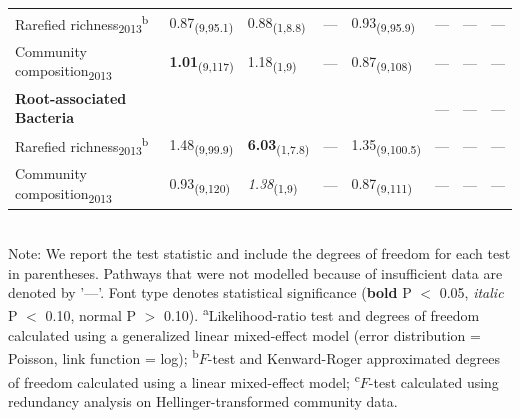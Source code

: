 \documentclass[11pt]{article}
\begin{document}
\begin{table}
\begin{tabular}{@{}llllllll@{}}
Rarefied richness\textsubscript{2013}\textsuperscript{b}     & 0.87\textsubscript{(9,95.1)}  & 0.88\textsubscript{(1,8.8)}  & ---               & 0.93\textsubscript{(9,95.9)}  & ---             & ---              & ---             \\
Community composition\textsubscript{2013}  & \textbf{1.01}\textsubscript{(9,117)}   & 1.18\textsubscript{(1,9)}    & ---               & 0.87\textsubscript{(9,108)}   & ---             & ---              & ---             \\
\textbf{Root-associated Bacteria}   &               &              &                 &               & ---             & ---              & ---             \\
Rarefied richness\textsubscript{2013}\textsuperscript{b}     & 1.48\textsubscript{(9,99.9)}  & \textbf{6.03}\textsubscript{(1,7.8)} & ---               & 1.35\textsubscript{(9,100.5)} & ---             & ---              & ---             \\
Community composition\textsubscript{2013}  & 0.93\textsubscript{(9,120)}   & \textit{1.38}\textsubscript{(1,9)}    & ---               & 0.87\textsubscript{(9,111)}   & ---             & ---              & ---  \\
\bottomrule
\end{tabular}
\bigskip{}
\\
{\footnotesize Note: We report the test statistic and include the degrees of freedom
for each test in parentheses. Pathways that were not modelled because of insufficient data are denoted by '---'. Font type denotes statistical significance
(\textbf{bold} P $<$ 0.05, \textit{italic} P $<$ 0.10, normal P
$>$ 0.10). \textsuperscript{a}Likelihood-ratio test and degrees of freedom calculated using a
generalized linear mixed-effect model (error distribution = Poisson,
link function = log); \textsuperscript{b}$F$-test and Kenward-Roger approximated degrees of
freedom calculated using a linear mixed-effect model; \textsuperscript{c}$F$-test calculated
using redundancy analysis on Hellinger-transformed community data.}
\end{table}
\end{document}
